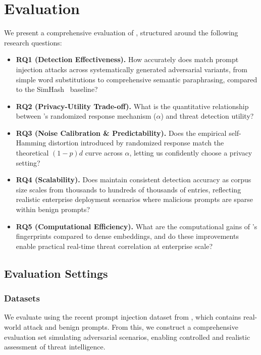 \section{Evaluation}
\label{sec:evaluation}



We present a comprehensive evaluation of \tool, structured around the following research questions:

\begin{itemize}
    \item \textbf{RQ1 (Detection Effectiveness).}
          How accurately does \tool match prompt injection attacks across systematically generated adversarial variants, from simple word substitutions to comprehensive semantic paraphrasing, compared to the SimHash~\cite{manku2007detecting} baseline?

    \item \textbf{RQ2 (Privacy-Utility Trade-off).} What is the quantitative relationship between \tool's randomized response mechanism ($\alpha$) and threat detection utility?

    \item \textbf{RQ3 (Noise Calibration \& Predictability).} Does the empirical self-Hamming distortion introduced by randomized response match the theoretical $(1-p)d$ curve across $\alpha$, letting us confidently choose a privacy setting?

    \item \textbf{RQ4 (Scalability).} Does \tool maintain consistent detection accuracy as corpus size scales from thousands to hundreds of thousands of entries, reflecting realistic enterprise deployment scenarios where malicious prompts are sparse within benign prompts?

    \item \textbf{RQ5 (Computational Efficiency).} What are the computational gains of \tool's fingerprints compared to dense embeddings, and do these improvements enable practical real-time threat correlation at enterprise scale?

\end{itemize}

\subsection{Evaluation Settings}

\subsubsection{Datasets}
We evaluate \tool using the recent prompt injection dataset from \cite{shen2024doanything}, which contains real-world attack and benign prompts. From this, we construct a comprehensive evaluation set simulating adversarial scenarios, enabling controlled and realistic assessment of threat intelligence. 

